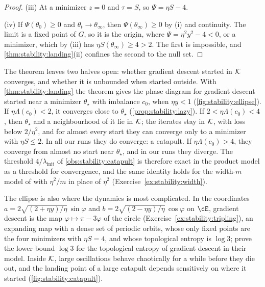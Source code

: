 \begin{refsection}
\begin{proof}
(iii) At a minimizer $z=0$ and $\tau=S$, so $\Psi=\eta S-4$.

(iv) If $\Psi(\theta_0)\ge0$ and $\theta_t\to\theta_\infty$, then $\Psi(\theta_\infty)\ge0$ by (i) and continuity. The limit is a fixed point of $G$, so it is the origin, where $\Psi=\eta^2y^2-4<0$, or a minimizer, which by (iii) has $\eta S(\theta_\infty)\ge4>2$. The first is impossible, and \cref{thm:stability:landing}(ii) confines the second to the null set.
\end{proof}

The theorem leaves two halves open: whether gradient descent started in $\mathcal{K}$ converges, and whether it is unbounded when started outside. With \cref{thm:stability:landing} the theorem gives the phase diagram for gradient descent started near a minimizer $\theta_\star$ with imbalance $c_0$, when $\eta y<1$ (\cref{fig:stability:ellipse}). If $\eta\Lambda(c_0)<2$, it converges close to $\theta_\star$ (\cref{prop:stability:lazy}). If $2<\eta\Lambda(c_0)<4$, then $\theta_\star$ and a neighbourhood of it lie in $\mathcal{K}$; the iterates stay in $\mathcal{K}$, with loss below $2/\eta^2$, and for almost every start they can converge only to a minimizer with $\eta S\le2$. In all our runs they do converge: a catapult. If $\eta\Lambda(c_0)>4$, they converge from almost no start near $\theta_\star$, and in our runs they diverge. The threshold $4/\lambda_{\mathrm{init}}$ of \cref{obs:stability:catapult} is therefore exact in the product model as a threshold for convergence, and the same identity holds for the width-$m$ model of \textcite{LewkowyczEtAl2020} with $\eta^2/m$ in place of $\eta^2$ (Exercise~\ref{ex:stability:width}).

The ellipse is also where the dynamics is most complicated. In the coordinates $a=2\sqrt{(2+\eta y)/\eta}\,\sin\varphi$ and $b=2\sqrt{(2-\eta y)/\eta}\,\cos\varphi$ on $\cE$, gradient descent is the map $\varphi\mapsto\pi-3\varphi$ of the circle (Exercise~\ref{ex:stability:tripling}), an expanding map with a dense set of periodic orbits, whose only fixed points are the four minimizers with $\eta S=4$, and whose topological entropy is $\log3$; \textcite{LiangMontufar2026} prove the lower bound $\log3$ for the topological entropy of gradient descent in their model. Inside $\mathcal{K}$, large oscillations behave chaotically for a while before they die out, and the landing point of a large catapult depends sensitively on where it started (\cref{fig:stability:catapult}).


\end{refsection}

